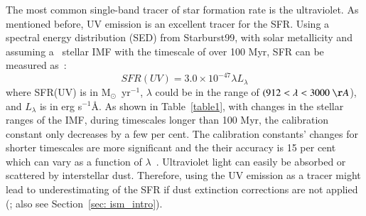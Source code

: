 The most common single-band tracer of star formation rate is the ultraviolet.
As mentioned before, UV emission is an excellent tracer for the SFR.
Using a spectral energy distribution (SED) from Starburst99, with solar metallicity and assuming a~\cite{Kroupa01} stellar IMF with the timescale of over 100 Myr, SFR can be measured as~\citep{Leitherer99}:
\begin{equation}
SFR(UV) = 3.0 \times 10^{-47}\lambda L_{\lambda}
\end{equation}
where SFR(UV) is in M$_{\odot}$~yr$^{-1}$, $\lambda$ could be in the range of $(912< \lambda < 3000~\AA$), and $L_{\lambda}$ is in erg s$^{-1}$\AA.
As shown in Table~\ref{table1}, with changes in the stellar ranges of the IMF, during timescales longer than 100 Myr, the calibration constant only decreases by a few per cent.
The calibration constants' changes for shorter timescales are more significant and 
the their accuracy is 15 per cent which can vary as a function of $\lambda$~\citep{Calzetti13}.
Ultraviolet light can easily be absorbed or scattered by interstellar dust. 
Therefore, using the UV emission as a tracer might lead to underestimating of the SFR if dust extinction corrections are not applied (\cite{Kennicutt12}; also see Section~\ref{sec: ism_intro}). 

